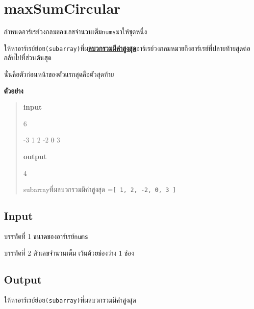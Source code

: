 \documentclass{article}
\begin{document}
\section*{maxSumCircular}

กำหนดอาร์เรย์วงกลมของเลขจำนวนเต็ม\texttt{nums}มาให้ชุดหนึ่ง

ให้หาอาร์เรย์ย่อย\texttt{(subarray)}ที่ผ\ul{\textbf{ลบวกรวมมีค่าสูงสุด}}อาร์เรย์วงกลมหมายถึงอาร์เรย์ที่ปลายท้ายสุดต่อกลับไปที่ส่วนต้นสุด

นั่นคือตัวก่อนหน้าของตัวแรกสุดคือตัวสุดท้าย\\



\hfill\break



\textbf{ตัวอย่าง}



\textbf{}



\begin{quote}

\textbf{input}



6



-3 1 2 -2 0 3



\textbf{output}



4



{subarrayที่ผลบวกรวมมีค่าสูงสุด =\texttt{{[}\ 1,\ 2,\ -2,\ 0,\ 3\ {]}}}

\end{quote}



\subsection*{Input}
บรรทัดที่ 1 ขนาดของอาร์เรย์\texttt{nums}



บรรทัดที่ 2 ตัวเลขจำนวนเต็ม เว้นด้วยช่องว่าง 1 ช่อง



\subsection*{Output}
{ให้หาอาร์เรย์ย่อย}\texttt{(subarray)}{ที่ผ}ลบวกรวมมีค่าสูงสุด\\
\end{document}
